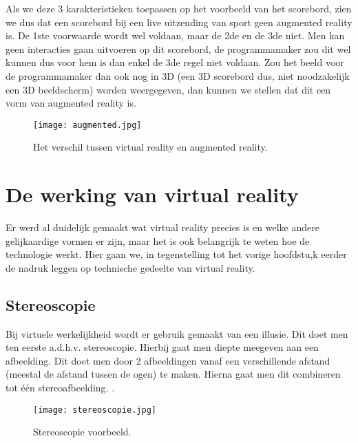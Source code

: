 Als we deze 3 karakteristieken toepassen op het voorbeeld van het scorebord, zien we dus dat een scorebord bij een live uitzending van sport geen augmented reality is. De 1ste voorwaarde wordt wel voldaan, maar de 2de en de 3de niet. Men kan geen interacties gaan uitvoeren op dit scorebord, de programmamaker zou dit wel kunnen dus voor hem is dan enkel de 3de regel niet voldaan. Zou het beeld voor de programmamaker dan ook nog in 3D (een 3D scorebord dus, niet noodzakelijk een 3D beeldscherm) worden weergegeven, dan kunnen we stellen dat dit een vorm van augmented reality is.

\begin{figure}[h]
	\centering
	\texttt{[image: augmented.jpg]}
	\caption{Het verschil tussen virtual reality en augmented reality.}
	\label{fig:augmented}
\end{figure}

\section{De werking van virtual reality}
\label{sec:hoe-werkt-vr}
Er werd al duidelijk gemaakt wat virtual reality precies is en welke andere gelijkaardige vormen er zijn, maar het is ook belangrijk te weten hoe de technologie werkt. Hier gaan we, in tegenstelling tot het vorige hoofdstu,k eerder de nadruk leggen op technische gedeelte van virtual reality.

\subsection{Stereoscopie}
\label{subsec:stereoscopie}
Bij virtuele werkelijkheid wordt er gebruik gemaakt van een illusie. Dit doet men ten eerste a.d.h.v. stereoscopie. Hierbij gaat men diepte meegeven aan een afbeelding. Dit doet men door 2 afbeeldingen vanaf een verschillende afstand (meestal de afstand tussen de ogen) te maken. Hierna gaat men dit combineren tot één stereoafbeelding. \autocite{Rouse2011}.

\begin{figure}
	\centering
	\texttt{[image: stereoscopie.jpg]}
	\caption{Stereoscopie voorbeeld.}
	\label{fig:stereoscopie}
\end{figure}

